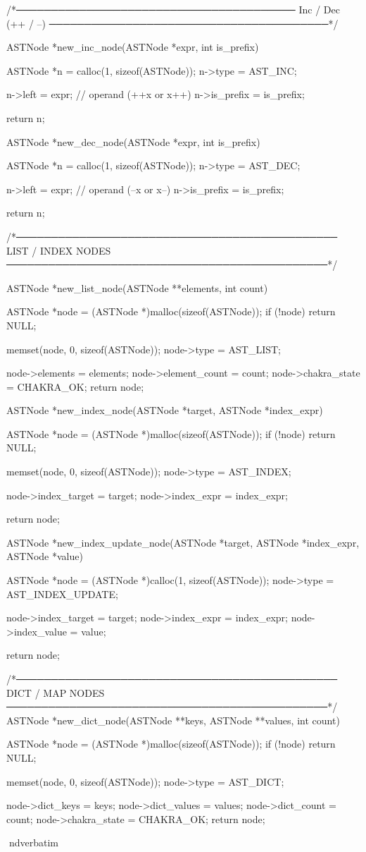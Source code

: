 \documentclass{article}
\begin{document}
/*────────────────────────────────────────
  Inc / Dec (++ / --)
────────────────────────────────────────*/

ASTNode *new_inc_node(ASTNode *expr, int is_prefix)
{
    ASTNode *n = calloc(1, sizeof(ASTNode));
    n->type = AST_INC;

    n->left = expr;          // operand (++x or x++)
    n->is_prefix = is_prefix;

    return n;
}

ASTNode *new_dec_node(ASTNode *expr, int is_prefix)
{
    ASTNode *n = calloc(1, sizeof(ASTNode));
    n->type = AST_DEC;

    n->left = expr;          // operand (--x or x--)
    n->is_prefix = is_prefix;

    return n;
}

/*──────────────────────────────────────────────
  LIST / INDEX NODES
──────────────────────────────────────────────*/

ASTNode *new_list_node(ASTNode **elements, int count)
{
    ASTNode *node = (ASTNode *)malloc(sizeof(ASTNode));
    if (!node) return NULL;

    memset(node, 0, sizeof(ASTNode));
    node->type = AST_LIST;

    node->elements = elements;
    node->element_count = count;
    node->chakra_state = CHAKRA_OK;
    return node;
}

ASTNode *new_index_node(ASTNode *target, ASTNode *index_expr)
{
    ASTNode *node = (ASTNode *)malloc(sizeof(ASTNode));
    if (!node) return NULL;

    memset(node, 0, sizeof(ASTNode));
    node->type = AST_INDEX;

    node->index_target = target;
    node->index_expr   = index_expr;

    return node;
}

ASTNode *new_index_update_node(ASTNode *target, ASTNode *index_expr, ASTNode *value)
{
    ASTNode *node = (ASTNode *)calloc(1, sizeof(ASTNode));
    node->type = AST_INDEX_UPDATE;

    node->index_target = target;
    node->index_expr = index_expr;
    node->index_value = value;

    return node;
}
/*──────────────────────────────────────────────
  DICT / MAP NODES
──────────────────────────────────────────────*/
ASTNode *new_dict_node(ASTNode **keys, ASTNode **values, int count)
{
    ASTNode *node = (ASTNode *)malloc(sizeof(ASTNode));
    if (!node) return NULL;

    memset(node, 0, sizeof(ASTNode));
    node->type = AST_DICT;

    node->dict_keys = keys;
    node->dict_values = values;
    node->dict_count = count;
    node->chakra_state = CHAKRA_OK;
    return node;
}
nd{verbatim}
\end{document}
